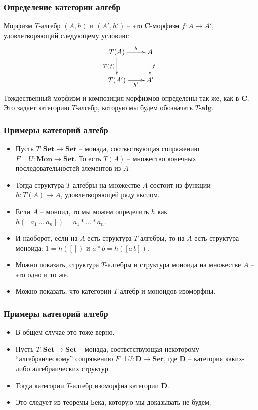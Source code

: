 \documentclass{beamer}
\theoremstyle{definition}
\newcommand{\cat}[1]{\mathbf{#1}}
\renewcommand{\C}{\cat{C}}
\newcommand{\D}{\cat{D}}
\newcommand{\Set}{\cat{Set}}
\newcommand{\Mon}{\cat{Mon}}
\begin{document}
\begin{frame}
\frametitle{Определение категории алгебр}
\begin{defn}
Морфизм $T$-алгебр $(A,h)$ и $(A',h')$ -- это $\C$-морфизм $f : A \to A'$, удовлетворяющий следующему условию:
\[ \xymatrix{ T(A) \ar[r]^-h \ar[d]_{T(f)} & A \ar[d]^f \\
              T(A') \ar[r]_-{h'}           & A'
            } \]
Тождественный морфизм и композиция морфизмов определены так же, как в $\C$.
Это задает категорию $T$-алгебр, которую мы будем обозначать $T\text{-}\cat{alg}$.
\end{defn}
\end{frame}

\begin{frame}
\frametitle{Примеры категорий алгебр}
\begin{itemize}
\item Пусть $T : \Set \to \Set$ -- монада, соотвествующая сопряжению $F \dashv U : \Mon \to \Set$.
То есть $T(A)$ -- множество конечных последовательностей элементов из $A$.
\item Тогда структура $T$-алгебры на множестве $A$ состоит из функции $h : T(A) \to A$, удовлетворяющей ряду аксиом.
\item Если $A$ -- моноид, то мы можем определить $h$ как $h([a_1\ \ldots\ a_n]) = a_1 * \ldots * a_n$.
\item И наоборот, если на $A$ есть структура $T$-алгебры, то на $A$ есть структура моноида: $1 = h([])$ и $a * b = h([a\,b])$.
\item Можно показать, структура $T$-алгебры и структура моноида на множестве $A$ -- это одно и то же.
\item Можно показать, что категории $T$-алгебр и моноидов изоморфны.
\end{itemize}
\end{frame}

\begin{frame}
\frametitle{Примеры категорий алгебр}
\begin{itemize}
\item В общем случае это тоже верно.
\item Пусть $T : \Set \to \Set$ -- монада, соответствующая некоторому ``алгебраическому'' сопряжению $F \dashv U : \D \to \Set$,
где $\D$ -- категория каких-либо алгебраических структур.
\item Тогда категории $T$-алгебр изоморфна категории $\D$.
\item Это следует из теоремы Бека, которую мы доказывать не будем.
\end{itemize}
\end{frame}
\end{document}
